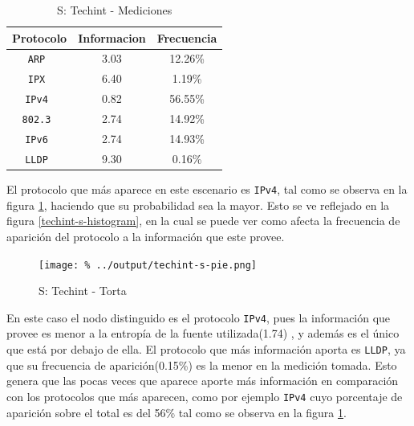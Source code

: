 \documentclass[final,inline,a4paper,narroweqnarray]{ieee}
\begin{document}
    \begin{table}\begin{center}
      \begin{tabular}{|c|c|c|}
      \hline
      \textbf{Protocolo} & \textbf{Informacion} & \textbf{Frecuencia} \\ \hline
      \texttt{ARP       }& 3.03        & 12.26\%    \\ \hline
      \texttt{IPX       }& 6.40        & 1.19\%     \\ \hline
      \texttt{IPv4      }& 0.82        & 56.55\%    \\ \hline
      \texttt{802.3     }& 2.74        & 14.92\%    \\ \hline
      \texttt{IPv6      }& 2.74        & 14.93\%    \\ \hline
      \texttt{LLDP      }& 9.30        & 0.16\%     \\ \hline
      \end{tabular}
      \caption{S: Techint - Mediciones}
      \label{techint-s-table}
    \end{center}\end{table}
    
    El protocolo que más aparece en este escenario es \texttt{IPv4},
    tal como se observa en la figura \ref{techint-s-pie}, haciendo que
    su probabilidad sea la mayor. Esto se ve reflejado en la figura
    \ref{techint-s-histogram}, en la cual se puede ver como afecta la
    frecuencia de aparición del protocolo a la información que este
    provee.

    
    \begin{figure}[ht]\begin{center}
      \texttt{[image: \%
      ../output/techint-s-pie.png]}
      \vspace{-3em}
      \caption{S: Techint - Torta}
      \label{techint-s-pie}
    \end{center}\end{figure}
 
    En este caso el nodo distinguido es el protocolo \texttt{IPv4},
    pues la información que provee es menor a la entropía de la fuente
    utilizada(1.74) , y además es el único que está por debajo de
    ella. El protocolo que más información aporta es \texttt{LLDP}, ya
    que su frecuencia de aparición(0.15\%) es la menor en la medición
    tomada. Esto genera que las pocas veces que aparece aporte más
    información en comparación con los protocolos que más aparecen,
    como por ejemplo \texttt{IPv4} cuyo porcentaje de aparición sobre
    el total es del 56\% tal como se observa en la figura
    \ref{techint-s-pie}.
\end{document}
